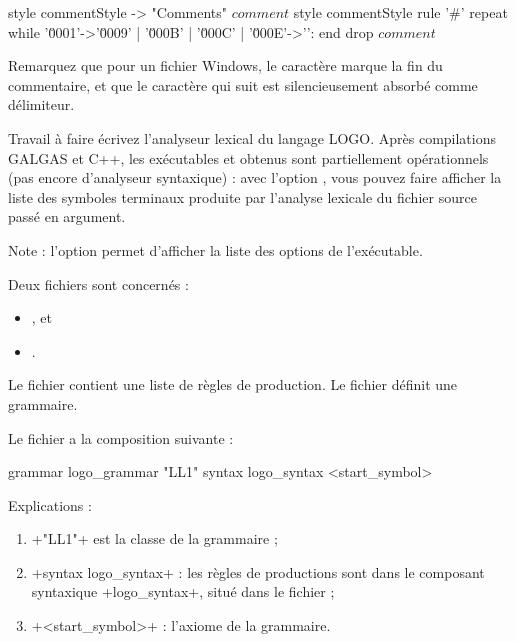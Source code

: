 \begin{galgas}
style commentStyle -> "Comments"
$comment$ style commentStyle %
rule '#' {
  repeat
  while '\u0001'->'\u0009' | '\u000B' | '\u000C' | '\u000E'->'\uFFFD':
  end
  drop $comment$
}
\end{galgas}

Remarquez que pour un fichier Windows, le caractère  marque la fin du commentaire, et que le caractère  qui suit est silencieusement absorbé comme délimiteur.

Travail à faire
écrivez l'analyseur lexical du langage LOGO. Après compilations GALGAS et C++, les exécutables  et  obtenus sont partiellement opérationnels (pas encore d’analyseur syntaxique) : avec l'option , vous pouvez faire afficher la liste des symboles terminaux produite par l'analyse lexicale du fichier source passé en argument.

Note : l'option  permet d'afficher la liste des options de l'exécutable. 


Deux fichiers sont concernés :
\begin{itemize}
  \item {}, et
  \item {}.
\end{itemize}

Le fichier  contient une liste de règles de production. Le fichier  définit une grammaire.

Le fichier  a la composition suivante :

\begin{galgas}
grammar logo_grammar "LL1" {
  syntax logo_syntax
  <start_symbol>
}
\end{galgas}

Explications :
\begin{enumerate}
  \item \ggs+"LL1"+ est la classe de la grammaire ;
  \item \ggs+syntax logo_syntax+ : les règles de productions sont dans le composant syntaxique \ggs+logo_syntax+, situé dans le fichier  ; 
  \item \ggs+<start_symbol>+ : l'axiome de la grammaire.
\end{enumerate}

